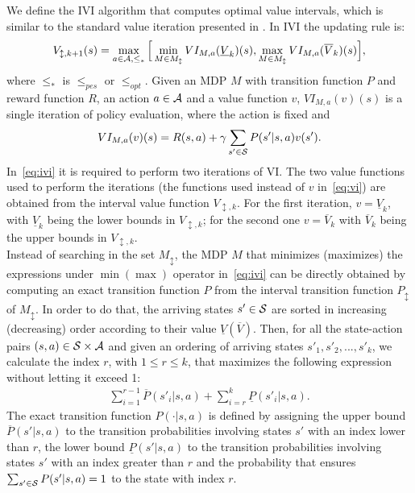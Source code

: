 \newline
We define the \acf{IVI} algorithm that computes optimal value intervals, which is similar to the standard value iteration presented in . In \ac{IVI} the updating rule is:
\begin{align}
V_{\updownarrow, k+1}(s) = \max_{a \in \mathcal{A}, \leq_{*}} \Big[ \min_{M \in M_{\updownarrow}} VI_{M, a}(\underline{V}_{k})(s), \max_{M \in M_{\updownarrow}} VI_{M, a}(\overline{V}_{k})(s) \Big], \label{eq:ivi}
\end{align}
where $\leq_{*}$ is $\leq_{pes}$ or $\leq_{opt}$. Given an \ac{MDP} $M$ with transition function $P$ and reward function $R$, an action $a \in \mathcal{A}$ and a value function $v$, $VI_{M, a}(v)(s)$ is a single iteration of policy evaluation, where the action is fixed and 
\begin{align} 
VI_{M, a}(v)(s) = R(s,a) + \gamma \sum_{s' \in \mathcal{S}} P(s'|s,a)v(s'). \label{eq:vi}
\end{align}
In~\eqref{eq:ivi} it is required to perform two iterations of VI. The two value functions used to perform the iterations (\ie the functions used instead of $v$ in~\eqref{eq:vi}) are obtained from the interval value function $V_{\updownarrow, k}$. For the first iteration, $v = \underline{V}_{k}$, with $\underline{V}_{k}$ being the lower bounds in $V_{\updownarrow, k}$; for the second one $v = \overline{V}_{k}$ with $\overline{V}_{k}$ being the upper bounds in $V_{\updownarrow, k}$.\\
\newline
Instead of searching in the set $M_{\updownarrow}$, the \ac{MDP} $M$ that minimizes (maximizes) the expressions under $\min (\max)$ operator in~\eqref{eq:ivi} can be directly obtained by computing an exact transition function $P$ from the interval transition function $P_{\updownarrow}$ of $M_{\updownarrow}$. In order to do that, the arriving states $s' \in \mathcal{S}$ are sorted in increasing (decreasing) order according to their value $\underline{V}(\overline{V})$. Then, for all the state-action pairs $(s,a) \in \mathcal{S} \times \mathcal{A}$ and given an ordering of arriving states $s'_1, s'_2, ..., s'_k$, we calculate the index $r$, with $1 \leq r \leq k$, that maximizes the following expression without letting it exceed 1:
\begin{align} \sum_{i=1}^{r-1}\overline{P}(s'_i|s,a) + \sum_{i=r}^{k}\underline{P}(s'_i|s,a). \end{align}
The exact transition function $P(\cdot|s,a)$ is defined by assigning the upper bound $\overline{P}(s'|s,a)$ to the transition probabilities involving states $s'$ with an index lower than $r$, the lower bound $\underline{P}(s'|s,a)$ to the transition probabilities involving states $s'$ with an index greater than $r$ and the probability that ensures $\sum_{s' \in \mathcal{S}}P(s'|s,a) = 1$ to the state with index $r$.

